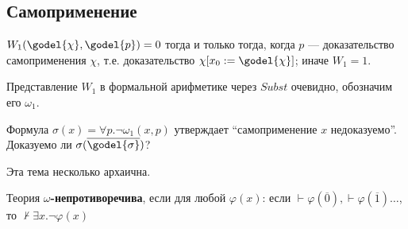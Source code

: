\subsection{Самоприменение}

\begin{definition}
	\(W_1(\godel{\chi}, \godel{p}) = 0\) тогда и только тогда, когда \(p\) --- доказательство самоприменения \(\chi\), т.е. доказательство \(\chi[x_0 : = \godel{\chi}]\); иначе \(W_1 = 1\).
\end{definition}

Представление \(W_1\) в формальной арифметике через \(Subst\) очевидно, обозначим его \(\omega_1\).

Формула \(\sigma(x) = \forall p.\neg \omega_1(x, p)\) утверждает ``самоприменение \(x\) недоказуемо''. Доказуемо ли \(\sigma(\overline{\godel{\sigma}})\)?

\begin{remark}
	Эта тема несколько архаична.
\end{remark}

\begin{definition}
	Теория \textbf{\(\omega\)-непротиворечива}, если для любой \(\varphi(x)\): если \(\vdash \varphi(\overline{0}), \vdash \varphi(\overline{1}) \dots \), то \(\nvdash \exists x.\neg \varphi(x)\)
\end{definition}
\unfinished
